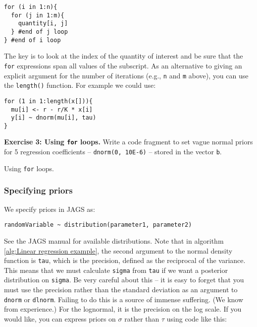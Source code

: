 \documentclass[12pt,english]{article}
\begin{document}
\begin{Verbatim}
for (i in 1:n){
  for (j in 1:m){
    quantity[i, j]
  } #end of j loop
} #end of i loop
\end{Verbatim}

\noindent The key is to look at the index of the quantity of interest and be sure that the \texttt{for} expressions span all values of the subscript. As an alternative to giving an explicit argument for the number of iterations (e.g., \texttt{n} and \texttt{m} above), you can use the \texttt{length()} function. For example we could use:

\begin{Verbatim}
for (1 in 1:length(x[])){
  mu[i] <- r - r/K * x[i]
  y[i] ~ dnorm(mu[i], tau)
}
\end{Verbatim}

\belowcaptionskip=-40pt
\begin{exercise}
\begin{mdframed}
\doublespacing
\textbf{Exercise 3: Using \texttt{for} loops.} Write a code fragment to set vague normal priors for 5 regression coefficients -- \texttt{dnorm(0, 10E-6)} -- stored in the vector \texttt{b}. 
\end{mdframed}
\captionsetup{textformat=empty, labelformat=empty}
\caption[Using \texttt{for} loops]{Using \texttt{for} loops.}
\label{ex:forloops}
\end{exercise}
\belowcaptionskip=0pt

\subsubsection{Specifying priors}

We specify priors in JAGS as:

\begin{Verbatim}
randomVariable ~ distribution(parameter1, parameter2)
\end{Verbatim}

\noindent See the JAGS manual for available distributions. Note that in algorithm \ref{alg:Linear regression example}, the second argument to the normal density function is \texttt{tau}, which is the precision, defined as the reciprocal of the variance. This means that we must calculate \texttt{sigma} from \texttt{tau} if we want a posterior distribution on \texttt{sigma}. Be very careful about this -- it is easy to forget that you must use the precision rather than the standard deviation as an argument to \texttt{dnorm} or \texttt{dlnorm}. Failing to do this is a source of immense suffering. (We know from experience.) For the lognormal, it is the precision on the log scale. If you would like, you can express priors on $\sigma$ rather than $\tau$ using code like this:
\end{document}
